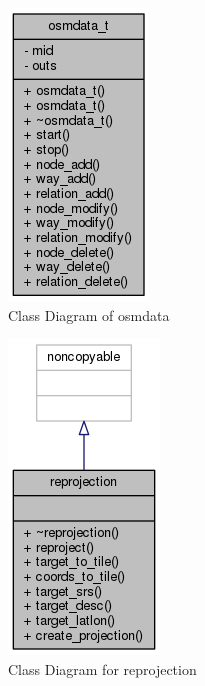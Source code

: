 \begin{figure}[t]
\centering
\includegraphics[scale=.85]{input/images/class_osmdata.png}
\caption{Class Diagram of osmdata}
\label{fig:classAnnotation__coll__graph}
\end{figure}
\fi

\begin{figure}
\centering
\includegraphics[scale=.85]{input/images/class_reprojection.png}
\caption{Class Diagram for reprojection}
\label{fig:classAnnotation__coll__graphh}
\end{figure}
